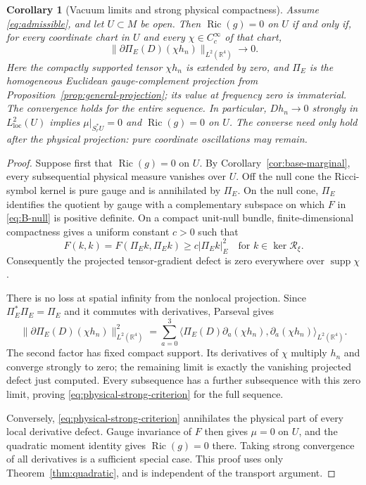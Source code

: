 \documentclass[11pt,a4paper]{article}
\numberwithin{equation}{section}
\newcommand{\Ric}{\operatorname{Ric}}
\newcommand{\supp}{\operatorname{supp}}
\newcommand{\loc}{\mathrm{loc}}
\newcommand{\R}{\mathbb R}
\newtheorem{corollary}[theorem]{Corollary}
\theoremstyle{definition}
\begin{document}
\begin{corollary}[Vacuum limits and strong physical compactness]
\label{cor:strong}
Assume \eqref{eq:admissible}, and let $U\subset M$ be open. Then
$\Ric(g)=0$ on $U$ if and only if, for every coordinate chart in $U$
and every $\chi\in C_c^\infty$ of that chart,
\begin{equation}\label{eq:physical-strong-criterion}
\|\partial\Pi_E(D)(\chi h_n)\|_{L^2(\R^4)}\longrightarrow0.
\end{equation}
Here the compactly supported tensor $\chi h_n$ is extended by zero, and $\Pi_E$ is
the homogeneous Euclidean gauge-complement projection from
Proposition~\ref{prop:general-projection}; its value at frequency zero
is immaterial. The convergence holds for the entire sequence.
In particular, $Dh_n\to0$ strongly in $L^2_{\loc}(U)$ implies
$\mu|_{S_r^*U}=0$ and $\Ric(g)=0$ on $U$. The converse need only hold after the physical
projection: pure coordinate oscillations may remain.
\end{corollary}
\begin{proof}
Suppose first that $\Ric(g)=0$ on $U$. By
Corollary~\ref{cor:base-marginal}, every subsequential physical measure
vanishes over $U$. Off the null cone the Ricci-symbol kernel is pure
gauge and is annihilated by $\Pi_E$. On the null cone, $\Pi_E$ identifies
the quotient by gauge with a complementary subspace on which $F$ in
\eqref{eq:B-null} is positive definite. On a compact unit-null bundle,
finite-dimensional compactness gives a uniform constant $c>0$ such that
\begin{equation*}
F(k,k)=F(\Pi_E k,\Pi_E k)\geq c|\Pi_E k|_E^2
\quad\text{for }k\in\ker\mathcal R_\xi.
\end{equation*}
Consequently the projected tensor-gradient defect is zero everywhere
over $\supp\chi$.

There is no loss at spatial infinity from the nonlocal projection.
Since $\Pi_E^*\Pi_E=\Pi_E$ and it commutes with derivatives, Parseval gives
\begin{equation*}
\|\partial\Pi_E(D)(\chi h_n)\|_{L^2(\R^4)}^2
=\sum_{a=0}^3\bigl\langle\Pi_E(D)\partial_a(\chi h_n),
                         \partial_a(\chi h_n)\bigr\rangle_{L^2(\R^4)}.
\end{equation*}
The second factor has fixed compact support. Its derivatives of $\chi$
multiply $h_n$ and converge strongly to zero; the remaining limit is
exactly the vanishing projected defect just computed. Every subsequence
has a further subsequence with this zero limit, proving
\eqref{eq:physical-strong-criterion} for the full sequence.

Conversely, \eqref{eq:physical-strong-criterion} annihilates the physical
part of every local derivative defect. Gauge invariance of $F$ then
gives $\mu=0$ on $U$, and the quadratic moment identity gives
$\Ric(g)=0$ there. Taking strong convergence of all derivatives is a
sufficient special case. This proof uses only
Theorem~\ref{thm:quadratic}, and is independent of the transport argument.
\end{proof}
\end{document}
